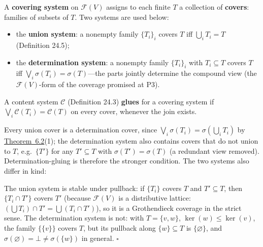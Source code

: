 \begin{thmdef}

A \textbf{covering system} on \(\mathcal{F}(V)\) assigns to each finite \(T\) a collection of \textbf{covers}: families of subsets of \(T\). Two systems are used below:

\begin{itemize}
\tightlist
\item
  the \textbf{union system}: a nonempty family \(\{T_i\}_i\) covers \(T\) iff \(\bigcup_i T_i = T\) (Definition 24.5);
\item
  the \textbf{determination system}: a nonempty family \(\{T_i\}_i\) with \(T_i \subseteq T\) covers \(T\) iff \(\bigvee_i \sigma(T_i) = \sigma(T)\)---\hspace{0pt}the parts jointly determine the compound view (the \(\mathcal{F}(V)\)-form of the coverage promised at P3).
\end{itemize}

A content system \(\mathcal{C}\) (Definition 24.3) \textbf{glues} for a covering system if \(\bigvee_i \mathcal{C}(T_i) = \mathcal{C}(T)\) on every cover, whenever the join exists.
\end{thmdef}

Every union cover is a determination cover, since \(\bigvee_i \sigma(T_i) = \sigma(\bigcup_i T_i)\) by \hyperlink{stmt:6.2}{Theorem~6.2}(1); the determination system also contains covers that do not union to \(T\), e.g.~\(\{T'\}\) for any \(T' \subseteq T\) with \(\sigma(T') = \sigma(T)\) (a redundant view removed). Determination-gluing is therefore the stronger condition. The two systems also differ in kind:

\begin{thmplain}

The union system is stable under pullback: if \(\{T_i\}\) covers \(T\) and \(T' \subseteq T\), then \(\{T_i \cap T'\}\) covers \(T'\) (because \(\mathcal{F}(V)\) is a distributive lattice: \((\bigcup T_i) \cap T' = \bigcup (T_i \cap T')\)), so it is a Grothendieck coverage in the strict sense. The determination system is not: with \(T = \{v, w\}\), \(\ker(w) \le \ker(v)\), the family \(\{\{v\}\}\) covers \(T\), but its pullback along \(\{w\} \subseteq T\) is \(\{\varnothing\}\), and \(\sigma(\varnothing) = \bot \ne \sigma(\{w\})\) in general. \(\square\)
\end{thmplain}

